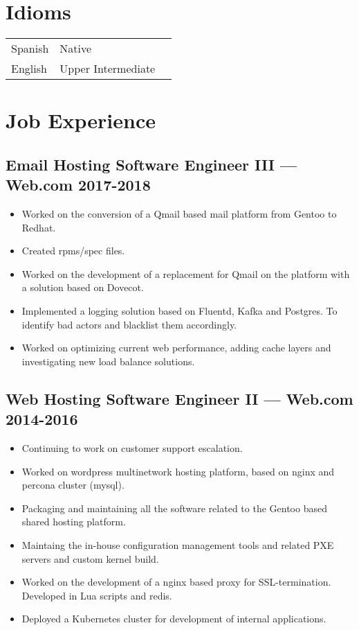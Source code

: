\documentclass[11pt]{article}
\begin{document}
\section{Idioms}


\begin{tabular}{@{}lll@{}}
  \hspace{.1em} Spanish & Native \\
  \hspace{.1em} English & Upper Intermediate
  \\
\end{tabular}


\section{Job Experience}


\subsection{Email Hosting Software Engineer III --- Web.com \hfill 2017-2018}
\begin{itemize}
  \setlength{\parskip}{0pt}
  \setlength{\itemsep}{0pt plus 1pt}
\item Worked on the conversion of a Qmail based mail platform from Gentoo to Redhat.
\item Created rpms/spec files.
\item Worked on the development of a replacement for Qmail on the platform with a solution based on Dovecot.
\item Implemented a logging solution based on Fluentd, Kafka and Postgres. To identify bad actors and blacklist them accordingly.
\item Worked on optimizing current web performance, adding cache layers and investigating new load balance solutions.
\end{itemize}

\subsection{Web Hosting Software Engineer II --- Web.com \hfill 2014-2016}
\begin{itemize}
  \setlength{\parskip}{0pt}
  \setlength{\itemsep}{0pt plus 1pt}
\item Continuing to work on customer support escalation.
\item Worked on wordpress multinetwork hosting platform, based on nginx and percona cluster (mysql).
\item Packaging and maintaining all the software related to the Gentoo based shared hosting platform.
\item Maintaing the in-house configuration management tools and related PXE servers and custom kernel build.
\item Worked on the development of a nginx based proxy for SSL-termination. Developed in Lua scripts and redis.
\item Deployed a Kubernetes cluster for development of internal applications.
\end{itemize}
\end{document}
